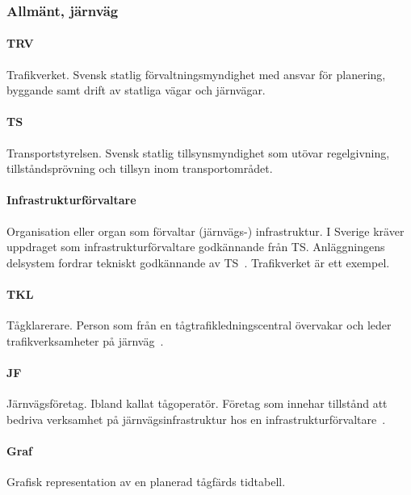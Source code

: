 \subsubsection{Allmänt, järnväg}
\paragraph{TRV}
Trafikverket.
Svensk statlig förvaltningsmyndighet med ansvar för planering, byggande samt drift av statliga vägar och järnvägar.
\paragraph{TS}
Transportstyrelsen.
Svensk statlig tillsynsmyndighet som utövar regelgivning, tillståndsprövning och tillsyn inom transportområdet.
\paragraph{Infrastrukturförvaltare}
Organisation eller organ som förvaltar (järnvägs-) infrastruktur.
I Sverige kräver uppdraget som infrastrukturförvaltare godkännande från TS\@.
Anläggningens delsystem fordrar tekniskt godkännande av TS~\cite{Infrastrukturforvaltare2024}.
Trafikverket är ett exempel.
\paragraph{TKL}
Tågklarerare.
Person som från en tågtrafikledningscentral övervakar och leder trafikverksamheter på järnväg~\cite{TTJ2015}.
\paragraph{JF}
Järnvägsföretag.
Ibland kallat tågoperatör.
Företag som innehar tillstånd att bedriva verksamhet på järnvägsinfrastruktur hos en infrastrukturförvaltare~\cite{Jarnvagsforetag2024}.
\paragraph{Graf}
Grafisk representation av en planerad tågfärds tidtabell.
